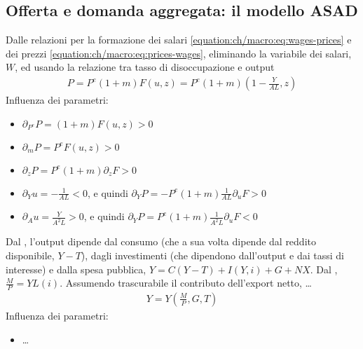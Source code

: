 \documentclass[letterpaper,10pt,italian]{jupyterBook}
\begin{document}
\subsection{Offerta e domanda aggregata: il modello AS\sphinxhyphen{}AD}
\label{\detokenize{ch/macro:offerta-e-domanda-aggregata-il-modello-as-ad}}\label{\detokenize{ch/macro:economics-hs-macro-medium-run-as-ad}}
\sphinxAtStartPar
{} Dalle relazioni per la formazione dei salari \eqref{equation:ch/macro:eq:wages-prices} e dei prezzi \eqref{equation:ch/macro:eq:prices-wages}, eliminando la variabile dei salari, \(W\), ed usando la relazione tra tasso di disoccupazione e output
\begin{equation}\label{equation:ch/macro:eq:as}
\begin{split}P = P^e (1+m) F(u,z) = P^e (1+m) \left( 1-\frac{Y}{A L}, z \right)\end{split}
\end{equation}
\sphinxAtStartPar
Influenza dei parametri:
\begin{itemize}
\item {} 
\sphinxAtStartPar
\(\partial_{P^e} P = (1+m) F(u,z) > 0\)

\item {} 
\sphinxAtStartPar
\(\partial_{m} P = P^e F(u,z) > 0\)

\item {} 
\sphinxAtStartPar
\(\partial_{z} P = P^e (1+m) \partial_z F > 0\)

\item {} 
\sphinxAtStartPar
\(\partial_{Y} u = - \frac{1}{A L} < 0\), e quindi \(\partial_Y P = - P^e (1+m) \frac{1}{AL} \partial_u F > 0\)

\item {} 
\sphinxAtStartPar
\(\partial_{A} u = \frac{Y}{A^2 L} > 0\), e quindi \(\partial_Y P = P^e (1+m) \frac{1}{A^2 L} \partial_u F < 0\)

\end{itemize}

\sphinxAtStartPar
{} Dal {\hyperref[\detokenize{ch/macro:economics-hs-macro-short-run-goods-market}]{}}, l’output dipende dal consumo (che a sua volta dipende dal reddito disponibile, \(Y- T\)), dagli investimenti (che dipendono dall’output e dai tassi di interesse) e dalla spesa pubblica, \(Y = C(Y-T) + I(Y,i) + G + NX\). Dal {\hyperref[\detokenize{ch/macro:economics-hs-macro-short-run-financial-market}]{}}, \(\frac{M}{P} = Y L(i)\). Assumendo trascurabile il contributo dell’export netto, …
\begin{equation}\label{equation:ch/macro:eq:ad}
\begin{split}Y = Y\left(\frac{M}{P}, G, T \right)\end{split}
\end{equation}
\sphinxAtStartPar
Influenza dei parametri:
\begin{itemize}
\item {} 
\sphinxAtStartPar
…

\end{itemize}
\end{document}
